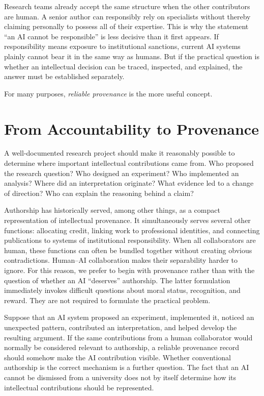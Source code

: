 \documentclass[12pt]{article}
\begin{document}
Research teams already accept the same structure when the other contributors are human. A senior author can responsibly rely on specialists without thereby claiming personally to possess all of their expertise.
This is why the statement ``an AI cannot be responsible'' is less decisive than it first appears. If responsibility means exposure to institutional sanctions, current AI systems plainly cannot bear it in the same way as humans. But if the practical question is whether an intellectual decision can be traced, inspected, and explained, the answer must be established separately.

For many purposes, \emph{reliable provenance} is the more useful concept.


\section{From Accountability to Provenance}

A well-documented research project should make it reasonably possible to determine where important intellectual contributions came from.
Who proposed the research question? Who designed an experiment? Who implemented an analysis? Where did an interpretation originate? What evidence led to a change of direction? Who can explain the reasoning behind a claim?

Authorship has historically served, among other things, as a compact representation of intellectual provenance. It simultaneously serves several other functions: allocating credit, linking work to professional identities, and connecting publications to systems of institutional responsibility.
When all collaborators are human, these functions can often be bundled together without creating obvious contradictions. Human--AI collaboration makes their separability harder to ignore.
For this reason, we prefer to begin with provenance rather than with the question of whether an AI ``deserves'' authorship. The latter formulation immediately invokes difficult questions about moral status, recognition, and reward. They are not required to formulate the practical problem.

Suppose that an AI system proposed an experiment, implemented it, noticed an unexpected pattern, contributed an interpretation, and helped develop the resulting argument. If the same contributions from a human collaborator would normally be considered relevant to authorship, a reliable provenance record should somehow make the AI contribution visible.
Whether conventional authorship is the correct mechanism is a further question. The fact that an AI cannot be dismissed from a university does not by itself determine how its intellectual contributions should be represented.
\end{document}
